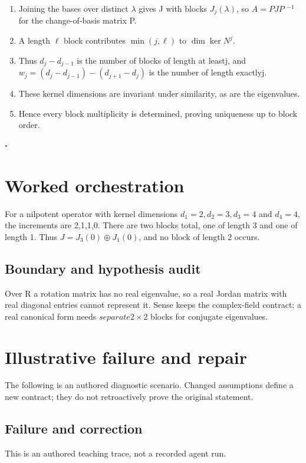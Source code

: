 \documentclass[preprint,12pt,aps,pra,showkeys,amsmath,amssymb,superscriptaddress,floatfix]{revtex4-2}
\theoremstyle{definition}
\theoremstyle{remark}
\begin{document}
\begin{enumerate}
\def\labelenumi{\arabic{enumi}.}
\item
  Joining the bases over distinct \(\lambda\) gives J with blocks
  \(J_j(\lambda )\), so \(A=PJP\) \(^{-1}\) for the change-of-basis
  matrix P.
\item
  A length \(\ell\) block contributes \(\operatorname{min} (j,\ell )\)
  to \(\dim\ker N^j\).
\item
  Thus \(d_j-d_{j-1}\) is the number of blocks of length at leastj, and
  \(w_j=(d_j-d_{j-1})-(d_{j+1}-d_j)\) is the number of length exactlyj.
\item
  These kernel dimensions are invariant under similarity, as are the
  eigenvalues.
\item
  Hence every block multiplicity is determined, proving uniqueness up to
  block order.
\end{enumerate}

\hfill$\square$

\section{Worked orchestration}

For a nilpotent operator with kernel dimensions
\(d_{1}=2,d_{2}=3,d_{3}=4\) and \(d_{4}=4\), the increments are 2,1,1,0.
There are two blocks total, one of length 3 and one of length 1. Thus
\(J=J_{3}(0)\oplus J_{1}(0)\), and no block of length 2 occurs.

\subsection{Boundary and hypothesis audit}

Over R a rotation matrix has no real eigenvalue, so a real Jordan matrix
with real diagonal entries cannot represent it. Sense keeps the
complex-field contract; a real canonical form needs
\(separate2\times 2\) blocks for conjugate eigenvalues.

\section{Illustrative failure and repair}

The following is an authored diagnostic scenario. Changed assumptions
define a new contract; they do not retroactively prove the original
statement.

\subsection{Failure and correction}
This is an authored teaching trace, not a recorded agent run.
\end{document}
